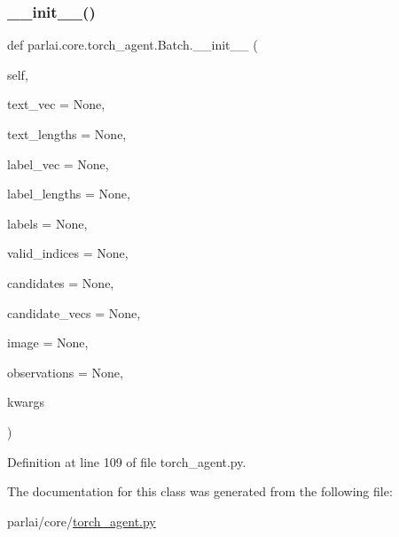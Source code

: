 \subsubsection{\texorpdfstring{\+\_\+\+\_\+init\+\_\+\+\_\+()}{\_\_init\_\_()}}
{\footnotesize\ttfamily def parlai.\+core.\+torch\+\_\+agent.\+Batch.\+\_\+\+\_\+init\+\_\+\+\_\+ (\begin{DoxyParamCaption}\item[{}]{self,  }\item[{}]{text\+\_\+vec = {\ttfamily None},  }\item[{}]{text\+\_\+lengths = {\ttfamily None},  }\item[{}]{label\+\_\+vec = {\ttfamily None},  }\item[{}]{label\+\_\+lengths = {\ttfamily None},  }\item[{}]{labels = {\ttfamily None},  }\item[{}]{valid\+\_\+indices = {\ttfamily None},  }\item[{}]{candidates = {\ttfamily None},  }\item[{}]{candidate\+\_\+vecs = {\ttfamily None},  }\item[{}]{image = {\ttfamily None},  }\item[{}]{observations = {\ttfamily None},  }\item[{}]{kwargs }\end{DoxyParamCaption})}



Definition at line 109 of file torch\+\_\+agent.\+py.



The documentation for this class was generated from the following file\+:\begin{DoxyCompactItemize}
\item 
parlai/core/\hyperlink{torch__agent_8py}{torch\+\_\+agent.\+py}\end{DoxyCompactItemize}
